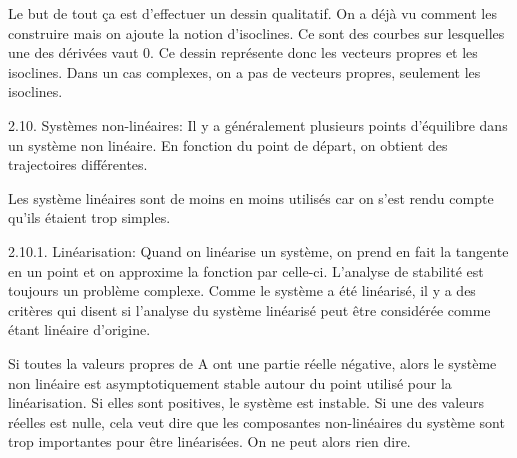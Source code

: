 Le but de tout ça est d'effectuer un dessin qualitatif. On a déjà vu comment les construire mais on ajoute la notion d’isoclines. Ce sont des courbes sur lesquelles une des dérivées vaut 0. Ce dessin représente donc les vecteurs propres et les isoclines.
Dans un cas complexes, on a pas de vecteurs propres, seulement les isoclines.


2.10. Systèmes non-linéaires:
Il y a généralement plusieurs points d’équilibre dans un système non linéaire. En fonction du point de départ, on obtient des trajectoires différentes.

Les système linéaires sont de moins en moins utilisés car on s’est rendu compte qu’ils étaient trop simples.

2.10.1. Linéarisation:
Quand on linéarise un système, on prend en fait la tangente en un point et on approxime la fonction par celle-ci.
L’analyse de stabilité est toujours un problème complexe. Comme le système a été linéarisé, il y a des critères qui disent si l’analyse du système linéarisé peut être considérée comme étant linéaire d’origine.

Si toutes la valeurs propres de A ont une partie réelle négative, alors le système non linéaire est asymptotiquement stable autour du point utilisé pour la linéarisation. Si elles sont positives, le système est instable.
Si une des valeurs réelles est nulle, cela veut dire que les composantes non-linéaires du système sont trop importantes pour être linéarisées. On ne peut alors rien dire.
